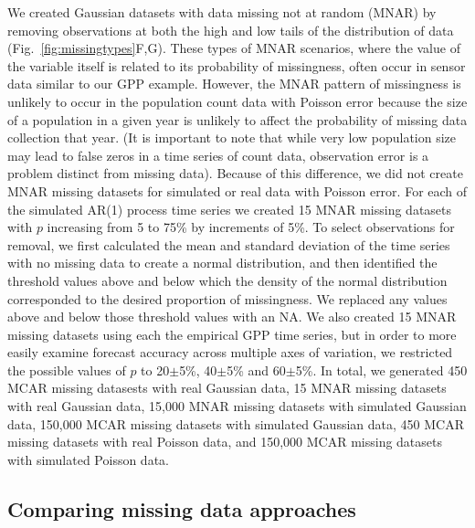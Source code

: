 \documentclass{article}
\begin{document}
We created Gaussian datasets with data missing not at random (MNAR) by removing observations at both the high and low tails of the distribution of data (Fig.\ \ref{fig:missingtypes}F,G). These types of MNAR scenarios, where the value of the variable itself is related to its probability of missingness, often occur in sensor data similar to our GPP example. However, the MNAR pattern of missingness is unlikely to occur in the population count data with Poisson error because the size of a population in a given year is unlikely to affect the probability of missing data collection that year. (It is important to note that while very low population size may lead to false zeros in a time series of count data, observation error is a problem distinct from missing data). Because of this difference, we did not create MNAR missing datasets for simulated or real data with Poisson error. For each of the simulated AR(1) process time series we created 15 MNAR missing datasets with $p$ increasing from 5 to 75\% by increments of 5\%. To select observations for removal, we first calculated the mean and standard deviation of the time series with no missing data to create a normal distribution, and then identified the threshold values above and below which the density of the normal distribution corresponded to the desired proportion of missingness. We replaced any values above and below those threshold values with an NA. We also created 15 MNAR missing datasets using each the empirical GPP time series, but in order to more easily examine forecast accuracy across multiple axes of variation, we restricted the possible values of $p$ to 20$\pm$5\%, 40$\pm$5\% and 60$\pm$5\%. In total, we generated 
450 MCAR missing datasests with real Gaussian data,
15 MNAR missing datasets with real Gaussian data,
15,000 MNAR missing datasets with simulated Gaussian data,
150,000 MCAR missing datasets with simulated Gaussian data,
450 MCAR missing datasets with real Poisson data, and 
150,000 MCAR missing datasets with simulated Poisson data. 


\subsection*{Comparing missing data approaches}
\end{document}
